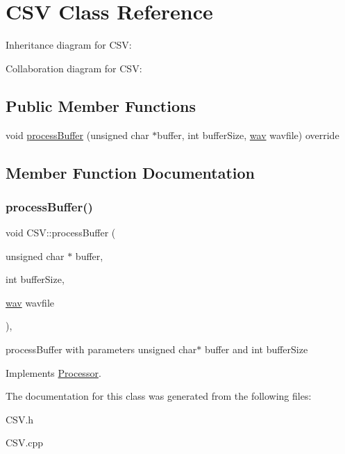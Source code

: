 \hypertarget{classCSV}{}\section{C\+SV Class Reference}
\label{classCSV}


Inheritance diagram for C\+SV\+:


Collaboration diagram for C\+SV\+:
\subsection*{Public Member Functions}
\begin{DoxyCompactItemize}
\item 
void \hyperlink{classCSV_a43b1da85359b104da24a2967f36936e6}{process\+Buffer} (unsigned char $\ast$buffer, int buffer\+Size, \hyperlink{classwav}{wav} wavfile) override
\end{DoxyCompactItemize}


\subsection{Member Function Documentation}
\mbox{\label{classCSV_a43b1da85359b104da24a2967f36936e6}} 
\subsubsection{\texorpdfstring{process\+Buffer()}{processBuffer()}}
{\footnotesize\ttfamily void C\+S\+V\+::process\+Buffer (\begin{DoxyParamCaption}\item[{unsigned char $\ast$}]{buffer,  }\item[{int}]{buffer\+Size,  }\item[{\hyperlink{classwav}{wav}}]{wavfile }\end{DoxyParamCaption})\hspace{0.3cm}{\ttfamily [override]}, {\ttfamily [virtual]}}

process\+Buffer with parameters unsigned char$\ast$ buffer and int buffer\+Size 

Implements \hyperlink{classProcessor_ad81c2b75979636bcee7f5182cdb79a86}{Processor}.



The documentation for this class was generated from the following files\+:\begin{DoxyCompactItemize}
\item 
C\+S\+V.\+h\item 
C\+S\+V.\+cpp\end{DoxyCompactItemize}

